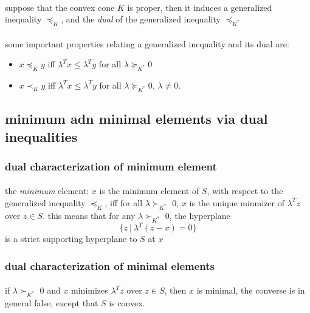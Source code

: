 \documentclass{article}
\begin{document}
    \paragraph{} suppose that the convex cone $K$ is proper, then it induces a generalized inequality $\preceq_K$, and the \textit{dual} of the generalized inequality $\preceq_{K^*}$
    \paragraph{} some important properties relating a generalized inequality and its dual are:
    \begin{itemize}
      \item $x \preceq_K y$ iff $\lambda^Tx \leq \lambda^Ty$ for all $\lambda \succeq_{K^*} 0$
      \item $x \prec_K y$ iff $\lambda^Tx \le \lambda^Ty$ for all $\lambda \succeq_{K^*} 0$, $\lambda \neq 0$.
    \end{itemize}
  \subsection{minimum adn minimal elements via dual inequalities}
    \subsubsection{dual characterization of minimum element}
      \paragraph{} the \textit{minimum} element: $x$ is the minimum element of $S$, with respect to the generalized inequality $\preceq_K$, iff for all $\lambda \succ_{K^*}$ 0, $x$ is the unique minmizer of $\lambda^Tz$ over $z \in S$. this means that for any $\lambda \succ_{K^*}$ 0, the hyperplane
      \begin{equation}
        \{z\ |\ \lambda^T(z - x) = 0\}
      \end{equation}
      is a strict supporting hyperplane to $S$ at $x$
    \subsubsection{dual characterization of minimal elements}
      \paragraph{} if $\lambda \succ_{K^*}$ 0 and $x$ minimizes $\lambda^Tz$ over $z \in S$, then $x$ is minimal, the converse is in general false, except that $S$ is convex.
\end{document}
